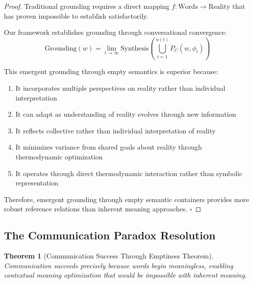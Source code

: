 \documentclass[11pt,a4paper]{article}
\newtheorem{theorem}{Theorem}[section]
\begin{document}
\begin{proof}
Traditional grounding requires a direct mapping $f: \text{Words} \to \text{Reality}$ that has proven impossible to establish satisfactorily.

Our framework establishes grounding through conversational convergence:
\begin{equation}
\text{Grounding}(w) = \lim_{t \to \infty} \text{Synthesis}\left(\bigcup_{i=1}^{n(t)} P_C(w,\phi_i)\right)
\end{equation}

This emergent grounding through empty semantics is superior because:
\begin{enumerate}
\item It incorporates multiple perspectives on reality rather than individual interpretation
\item It can adapt as understanding of reality evolves through new information
\item It reflects collective rather than individual interpretation of reality
\item It minimizes variance from shared goals about reality through thermodynamic optimization
\item It operates through direct thermodynamic interaction rather than symbolic representation
\end{enumerate}

Therefore, emergent grounding through empty semantic containers provides more robust reference relations than inherent meaning approaches. $\square$
\end{proof}

\subsection{The Communication Paradox Resolution}

\begin{theorem}[Communication Success Through Emptiness Theorem]
Communication succeeds precisely because words begin meaningless, enabling contextual meaning optimization that would be impossible with inherent meaning.
\end{theorem}
\end{document}
